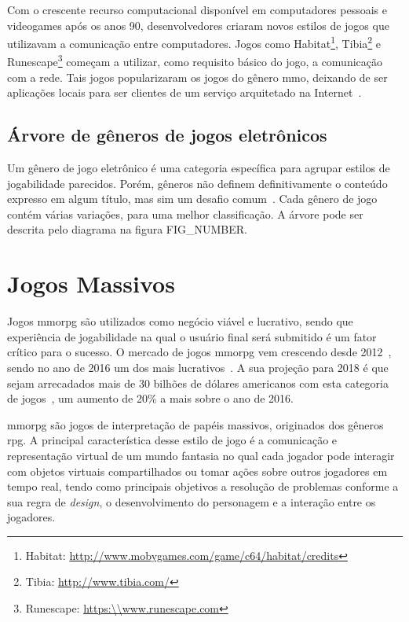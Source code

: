 Com o crescente recurso computacional disponível em computadores pessoais e videogames após os anos 90, desenvolvedores criaram novos estilos de jogos que utilizavam a comunicação entre computadores.
%
Jogos como Habitat\footnote{Habitat: \url{http://www.mobygames.com/game/c64/habitat/credits}}, Tibia\footnote{Tibia: \url{http://www.tibia.com/}} e Runescape\footnote{Runescape: \url{https:\\www.runescape.com}} começam a utilizar, como requisito básico do jogo, a comunicação com a rede.
%
Tais jogos popularizaram os jogos do gênero \ac{mmo}, deixando de ser aplicações locais para ser clientes de um serviço arquitetado na Internet~\cite{adams_1208533, Adams2014Jan}.



\subsection{Árvore de gêneros de jogos eletrônicos}



Um gênero de jogo eletrônico é uma categoria específica para agrupar estilos de jogabilidade parecidos.
%
Porém, gêneros não definem definitivamente o conteúdo expresso em algum título, mas sim um desafio comum~\cite{adams_1208533, video_game_technologies}.
%
Cada gênero de jogo contém várias variações, para uma melhor classificação.
%
A árvore pode ser descrita pelo diagrama na figura FIG\_NUMBER.



\section{Jogos Massivos}



Jogos \ac{mmorpg} são utilizados como negócio viável e lucrativo, sendo que experiência de jogabilidade na qual o usuário final será submitido é um fator crítico para o sucesso.
%
O mercado de jogos \ac{mmorpg} vem crescendo desde 2012~\cite{new_york_times}, sendo no ano de 2016 um dos mais lucrativos~\cite{statista_2016}.
%
A sua projeção para 2018 é que sejam arrecadados mais de 30 bilhões de dólares americanos com esta categoria de jogos~\cite{statista_2018}, um aumento de 20\% a mais sobre o ano de 2016.



\ac{mmorpg} são jogos de interpretação de papéis massivos, originados dos gêneros \ac{rpg}.
%
A principal característica desse estilo de jogo é a comunicação e representação virtual de um mundo fantasia no qual cada jogador pode interagir com objetos virtuais compartilhados ou tomar ações sobre outros jogadores em tempo real, tendo como principais objetivos a resolução de problemas conforme a sua regra de \textit{design}, o desenvolvimento do personagem e a interação entre os jogadores\cite{video_game_technologies}.
%

